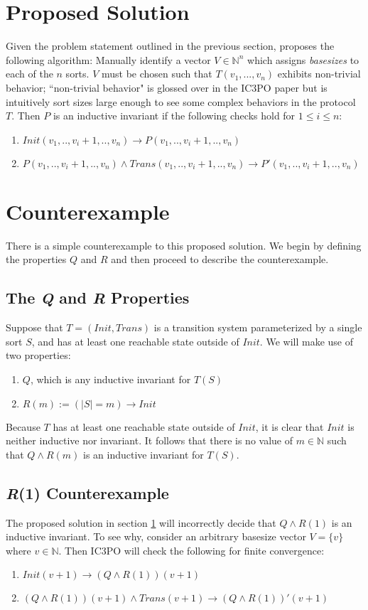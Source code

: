 \documentclass[12pt]{article}
\begin{document}
\section{Proposed Solution}
\label{sol}
Given the problem statement outlined in the previous section, \cite{goel2021symmetry} proposes the following algorithm: Manually identify a vector $V \in \mathbb{N}^n$ which assigns \textit{basesizes} to each of the $n$ sorts.  $V$ must be chosen such that $T(v_1,...,v_n)$ exhibits non-trivial behavior; ``non-trivial behavior" is glossed over in the IC3PO paper but is intuitively sort sizes large enough to see some complex behaviors in the protocol $T$.  Then $P$ is an inductive invariant if the following checks hold for $1 \leq i \leq n$:
\begin{enumerate}
  \item $Init(v_1,..,v_i+1,..,v_n) \rightarrow P(v_1,..,v_i+1,..,v_n)$
  \item $P(v_1,..,v_i+1,..,v_n) \land Trans(v_1,..,v_i+1,..,v_n) \rightarrow P'(v_1,..,v_i+1,..,v_n)$
\end{enumerate}

\section{Counterexample}
There is a simple counterexample to this proposed solution.  We begin by defining the properties $Q$ and $R$ and then proceed to describe the counterexample.

\subsection{The \textit{Q} and \textit{R} Properties}
Suppose that $T = (Init,Trans)$ is a transition system parameterized by a single sort $S$, and has at least one reachable state outside of $Init$.  We will make use of two properties:
\begin{enumerate}
  \item $Q$, which is any inductive invariant for $T(S)$
  \item $R(m) := (|S|=m) \rightarrow Init$
\end{enumerate}

Because $T$ has at least one reachable state outside of $Init$, it is clear that $Init$ is neither inductive nor invariant.  It follows that there is no value of $m \in \mathbb{N}$ such that $Q \land R(m)$ is an inductive invariant for $T(S)$.

\subsection{\textit{R}(1) Counterexample}
The proposed solution in section \ref{sol} will incorrectly decide that $Q \land R(1)$ is an inductive invariant.  To see why, consider an arbitrary basesize vector $V = \{v\}$ where $v \in \mathbb{N}$.  Then IC3PO will check the following for finite convergence:
\begin{enumerate}
  \item $Init(v+1) \rightarrow (Q \land R(1))(v+1)$
  \item $(Q \land R(1))(v+1) \land Trans(v+1) \rightarrow (Q \land R(1))'(v+1)$
\end{enumerate}
\end{document}
